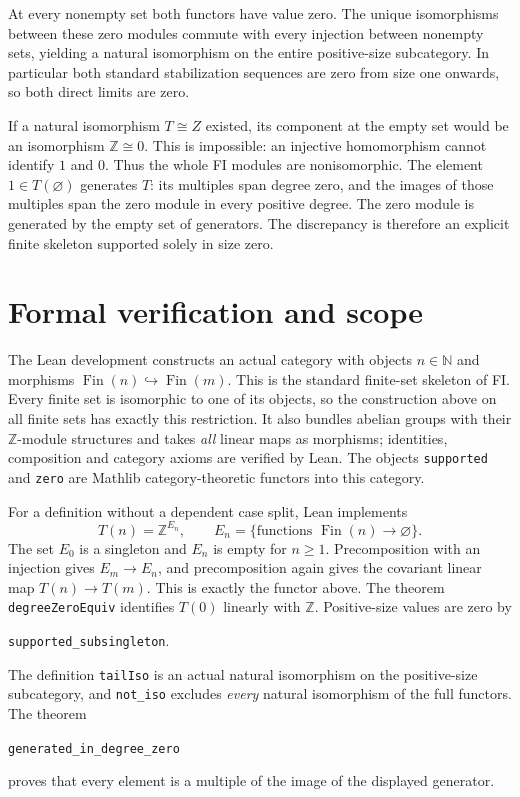 \documentclass[11pt]{article}
\begin{document}
At every nonempty set both functors have value zero. The unique
isomorphisms between these zero modules commute with every injection
between nonempty sets, yielding a natural isomorphism on the entire
positive-size subcategory. In particular both standard stabilization
sequences are zero from size one onwards, so both direct limits are zero.

If a natural isomorphism $T\cong Z$ existed, its component at the empty
set would be an isomorphism $\mathbb Z\cong0$. This is impossible: an
injective homomorphism cannot identify $1$ and $0$. Thus the whole FI
modules are nonisomorphic. The element $1\in T(\varnothing)$ generates
$T$: its multiples span degree zero, and the images of those multiples
span the zero module in every positive degree. The zero module is
generated by the empty set of generators. The discrepancy is therefore
an explicit finite skeleton supported solely in size zero.

\section*{Formal verification and scope}
The Lean development constructs an actual category with objects $n\in
\mathbb N$ and morphisms $\operatorname{Fin}(n)\hookrightarrow
\operatorname{Fin}(m)$. This is the standard finite-set skeleton of FI.
Every finite set is isomorphic to one of its objects, so the construction
above on all finite sets has exactly this restriction. It also bundles
abelian groups with their $\mathbb Z$-module structures and takes
\emph{all} linear maps as morphisms; identities, composition and category
axioms are verified by Lean. The objects \texttt{supported} and
\texttt{zero} are Mathlib category-theoretic functors into this category.

For a definition without a dependent case split, Lean implements
\[
 T(n)=\mathbb Z^{E_n},\qquad
 E_n=\{\text{functions }\operatorname{Fin}(n)\longrightarrow\varnothing\}.
\]
The set $E_0$ is a singleton and $E_n$ is empty for $n\ge1$. Precomposition
with an injection gives $E_m\to E_n$, and precomposition again gives the
covariant linear map $T(n)\to T(m)$. This is exactly the functor above.
The theorem \texttt{degreeZeroEquiv} identifies $T(0)$ linearly with
$\mathbb Z$. Positive-size values are zero by
\begin{center}\texttt{supported\_subsingleton}.\end{center}
The definition \texttt{tailIso} is an actual natural
isomorphism on the positive-size subcategory, and \texttt{not\_iso}
excludes \emph{every} natural isomorphism of the full functors.
The theorem
\begin{center}\texttt{generated\_in\_degree\_zero}\end{center}
proves that every element is a multiple of the image of the displayed generator.
\end{document}
